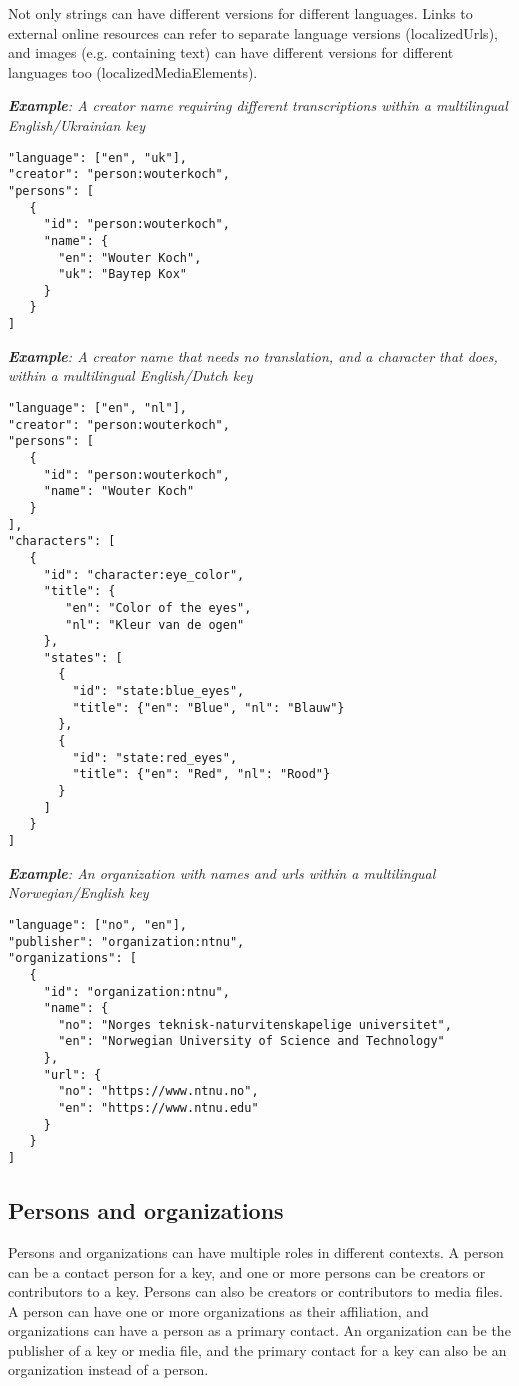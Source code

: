 \documentclass[10pt,letterpaper]{article}
\begin{document}
Not only strings can have different versions for different languages. Links to external online resources can refer to separate language versions (localizedUrls), and images (e.g. containing text) can have different versions for different languages too (localizedMediaElements).

\textit{\textbf{Example}: A creator name requiring different transcriptions within a multilingual English/Ukrainian key}
\begin{verbatim}
"language": ["en", "uk"],
"creator": "person:wouterkoch",
"persons": [
   {
     "id": "person:wouterkoch",
     "name": {
       "en": "Wouter Koch",
       "uk": "Ваутер Кох"
     }
   }
]

\end{verbatim}

\textit{\textbf{Example}: A creator name that needs no translation, and a character that does, within a multilingual English/Dutch key}

\begin{verbatim}
"language": ["en", "nl"],
"creator": "person:wouterkoch",
"persons": [
   {
     "id": "person:wouterkoch",
     "name": "Wouter Koch"
   }
],
"characters": [
   {
     "id": "character:eye_color",
     "title": {
        "en": "Color of the eyes",
        "nl": "Kleur van de ogen"
     },
     "states": [
       {
         "id": "state:blue_eyes",
         "title": {"en": "Blue", "nl": "Blauw"}
       },
       {
         "id": "state:red_eyes",
         "title": {"en": "Red", "nl": "Rood"}
       }
     ]
   }
]

\end{verbatim}

\textit{\textbf{Example}: An organization with names and urls within a multilingual Norwegian/English key}

\begin{verbatim}
"language": ["no", "en"],
"publisher": "organization:ntnu",
"organizations": [
   {
     "id": "organization:ntnu",
     "name": {
       "no": "Norges teknisk-naturvitenskapelige universitet",
       "en": "Norwegian University of Science and Technology"
     },
     "url": {
       "no": "https://www.ntnu.no",
       "en": "https://www.ntnu.edu"
     }
   }
]

\end{verbatim}
\subsection*{
Persons and organizations
}
Persons and organizations can have multiple roles in different contexts. A person can be a contact person for a key, and one or more persons can be creators or contributors to a key. Persons can also be creators or contributors to media files. A person can have one or more organizations as their affiliation, and organizations can have a person as a primary contact. An organization can be the publisher of a key or media file, and the primary contact for a key can also be an organization instead of a person.
\end{document}
